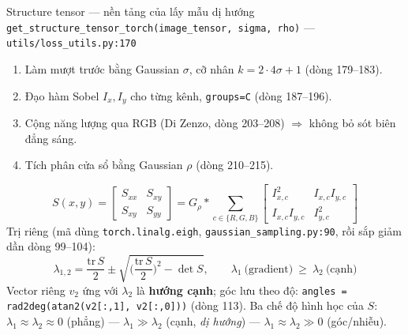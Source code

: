 \begin{frame}{Structure tensor --- nền tảng của lấy mẫu dị hướng}
\footnotesize
\texttt{get\_structure\_tensor\_torch(image\_tensor, sigma, rho)} --- \texttt{utils/loss\_utils.py:170}
\begin{enumerate}\scriptsize
  \item Làm mượt trước bằng Gaussian $\sigma$, cỡ nhân $k=2\cdot4\sigma+1$ (dòng 179--183).
  \item Đạo hàm Sobel $I_x, I_y$ cho từng kênh, \texttt{groups=C} (dòng 187--196).
  \item Cộng năng lượng qua RGB (Di Zenzo, dòng 203--208) $\Rightarrow$ không bỏ sót biên đẳng sáng.
  \item Tích phân cửa sổ bằng Gaussian $\rho$ (dòng 210--215).
\end{enumerate}
\[
S(x,y)=
\begin{bmatrix} S_{xx} & S_{xy}\\ S_{xy} & S_{yy}\end{bmatrix}
= G_{\rho} * \sum_{c\in\{R,G,B\}}
\begin{bmatrix} I_{x,c}^2 & I_{x,c}I_{y,c}\\ I_{x,c}I_{y,c} & I_{y,c}^2\end{bmatrix}
\]
Trị riêng (mã dùng \texttt{torch.linalg.eigh}, \texttt{gaussian\_sampling.py:90}, rồi sắp giảm dần dòng 99--104):
\[
\lambda_{1,2}=\frac{\mathrm{tr}\,S}{2}\pm\sqrt{\Big(\frac{\mathrm{tr}\,S}{2}\Big)^{2}-\det S},
\qquad \lambda_1\ \text{(gradient)} \ \ge\ \lambda_2\ \text{(cạnh)}
\]
Vector riêng $v_2$ ứng với $\lambda_2$ là \textbf{hướng cạnh}; góc lưu theo độ: \texttt{angles = rad2deg(atan2(v2[:,1], v2[:,0]))} (dòng 113).
\vspace{0.2em}
\scriptsize Ba chế độ hình học của $S$: $\lambda_1\!\approx\!\lambda_2\!\approx\!0$ (phẳng) --- $\lambda_1\!\gg\!\lambda_2$ (cạnh, \emph{dị hướng}) --- $\lambda_1\!\approx\!\lambda_2\!\gg\!0$ (góc/nhiễu).
\end{frame}


